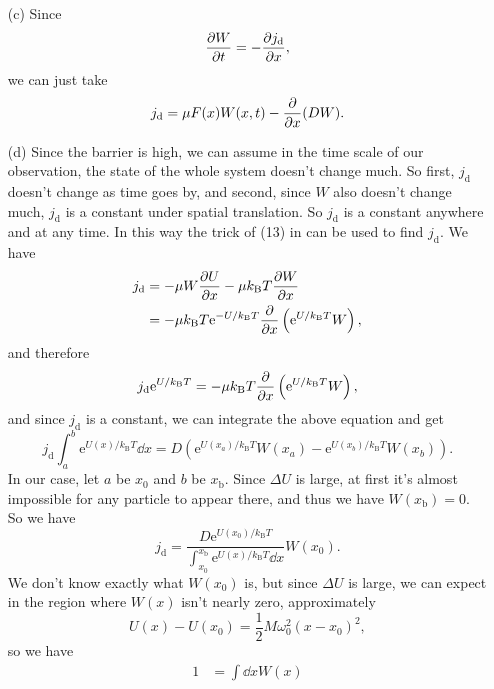 \documentclass[hyperref, a4paper]{article}
\newcommand*{\ee}{\mathrm{e}}
\begin{document}
\begin{itemize}
\item[(c)] Since  
\begin{equation}
    \pdv{W}{t} = - \pdv{j_{\text{d}}}{x},
\end{equation}
we can just take 
\begin{equation}
    j_{\text{d}} = \mu F(x) W(x, t) - \pdv{x} (D W).
\end{equation}

\item[(d)] Since the barrier is high,
we can assume in the time scale of our observation,
the state of the whole system doesn't change much.
So first, $j_{\text{d}}$ doesn't change as time goes by,
and second, since $W$ also doesn't change much,
$j_{\text{d}}$ is a constant under spatial translation.
So $j_{\text{d}}$ is a constant anywhere and at any time.
In this way the trick of (13) in \cite{kramers1940284} can be used to find $j_{\text{d}}$.
We have 
\[
    \begin{aligned}
        j_{\text{d}} &= - \mu W \pdv{U}{x} - \mu k_{\text{B}} T \pdv{W}{x} \\
        &= - \mu k_{\text{B}} T \ee^{- U / k_{\text{B}} T} 
        \pdv{x} \left( \ee^{U / k_{\text{B}} T} W \right) ,
    \end{aligned}
\]
and therefore 
\[
    j_{\text{d}} \ee^{U / k_{\text{B}} T} = - \mu k_{\text{B}} T \pdv{x} \left( \ee^{U / k_{\text{B}} T} W \right),
\]
and since $j_{\text{d}}$ is a constant, 
we can integrate the above equation and get 
\begin{equation}
    j_{\text{d}} \int_a^b \ee^{U(x) / k_{\text{B}} T} \dd{x} 
    = D \left(\ee^{U(x_a) / k_{\text{B}} T} W(x_a) - \ee^{U(x_b) / k_{\text{B}} T} W(x_b) \right).
\end{equation}
In our case, let $a$ be $x_0$ and $b$ be $x_{\text{b}}$.
Since $\Delta U$ is large, at first it's almost impossible for any particle to appear there,
and thus we have $W(x_{\text{b}}) = 0$.
So we have 
\[
    j_{\text{d}} = \frac{
        D \ee^{U(x_0) / k_{\text{B}} T}
    }{
        \int_{x_0}^{x_{\text{b}}} \ee^{U(x) / k_{\text{B}} T} \dd{x}
    } W(x_0).
\]
We don't know exactly what $W(x_0)$ is, but since $\Delta U$ is large,
we can expect in the region where $W(x)$ isn't nearly zero, approximately 
\begin{equation}
    U(x) - U(x_0) = \frac{1}{2} M \omega_0^2 (x - x_0)^2,
\end{equation}
so we have 
\[
    \begin{aligned}
        1 &= \int \dd{x} W(x) \\

\end{aligned}\]
\end{itemize}
\end{document}
